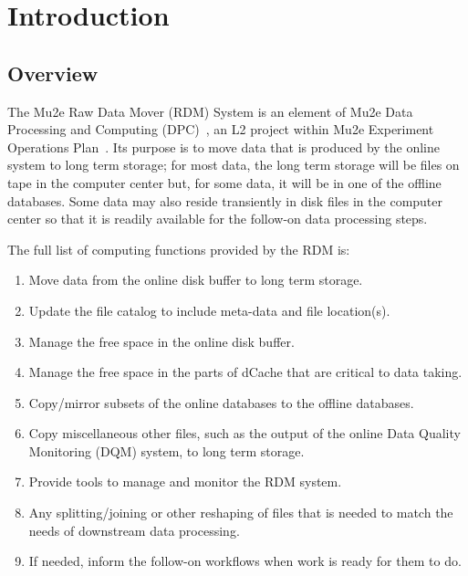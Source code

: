 \chapter{Introduction}
\label{ch:intro}

\section{Overview}
\label{sec:overview}

The Mu2e Raw Data Mover (RDM) System is an element of Mu2e Data Processing
and Computing (DPC)~\cite{DPC}, an L2 project within Mu2e Experiment Operations Plan~\cite{PEOP}.
Its purpose is to move data
that is produced by the online system to long term storage;
for most data, the long term storage will be files on tape in the computer center
but, for some data, it will be in one of the offline databases.
Some data may also reside transiently in disk files in the computer center so that
it is readily available for the follow-on data processing steps.

The full list of computing functions provided by the RDM is:
\begin{enumerate}
\item Move data from the online disk buffer to long term storage.
\item Update the file catalog to include meta-data and file location(s).
\item Manage the free space in the online disk buffer.
\item Manage the free space in the parts of dCache that are critical to data taking.
\item Copy/mirror subsets of the online databases to the offline databases.
\item Copy miscellaneous other files, such as the output of the online Data Quality Monitoring (DQM) system, to long term storage.
\item Provide tools to manage and monitor the RDM system.
\item Any splitting/joining or other reshaping of files that is needed to match the needs of downstream data processing.
\item If needed, inform the follow-on workflows when work is ready for them to do.
\end{enumerate}



